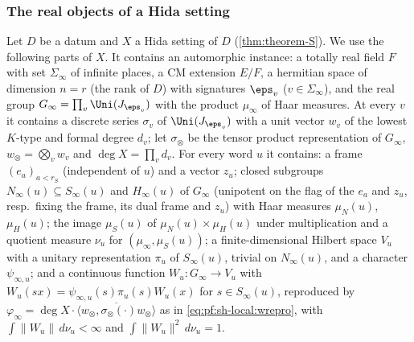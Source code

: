 \subsubsection{The real objects of a Hida setting}
Let $D$ be a datum and $X$ a Hida setting of $D$ (\cref{thm:theorem-S}). We use the following parts of $X$. It contains an automorphic
instance: a totally real field $F$ with set $\Sigma_\infty$ of infinite places, a CM extension $E/F$, a hermitian
space of dimension $n=r$ (the rank of $D$) with signatures $\eps_v$ ($v\in\Sigma_\infty$), and the real group
$G_\infty=\prod_v\Uni(J_{\eps_v})$ with the product $\mu_\infty$ of Haar measures. At every $v$ it contains a discrete
series $\sigma_v$ of $\Uni(J_{\eps_v})$ with a unit vector $w_v$ of the lowest $K$-type and formal degree $d_v$; let
$\sigma_\otimes$ be the tensor product representation of $G_\infty$, $w_\otimes=\bigotimes_vw_v$ and
$\deg X=\prod_vd_v$. For every word $u$ it contains: a frame $(e_a)_{a<r_S}$ (independent of $u$) and a vector
$z_u$; closed subgroups $N_\infty(u)\subseteq S_\infty(u)$ and $H_\infty(u)$ of $G_\infty$ (unipotent on the flag of
the $e_a$ and $z_u$, resp.\ fixing the frame, its dual frame and $z_u$) with Haar measures $\mu_N(u)$, $\mu_H(u)$;
the image $\mu_S(u)$ of $\mu_N(u)\times\mu_H(u)$ under multiplication and a quotient measure $\nu_u$ for
$(\mu_\infty,\mu_S(u))$; a finite-dimensional Hilbert space $V_u$ with a unitary representation $\pi_u$ of
$S_\infty(u)$, trivial on $N_\infty(u)$, and a character $\psi_{\infty,u}$; and a continuous function
$W_u:G_\infty\to V_u$ with $W_u(sx)=\psi_{\infty,u}(s)\pi_u(s)W_u(x)$ for $s\in S_\infty(u)$, reproduced by
$\varphi_\infty=\deg X\cdot\overline{\langle w_\otimes,\sigma_\otimes(\cdot)w_\otimes\rangle}$ as in
\eqref{eq:pf:sh-local:wrepro}, with $\int\|W_u\|\,d\nu_u<\infty$ and $\int\|W_u\|^2\,d\nu_u=1$.

